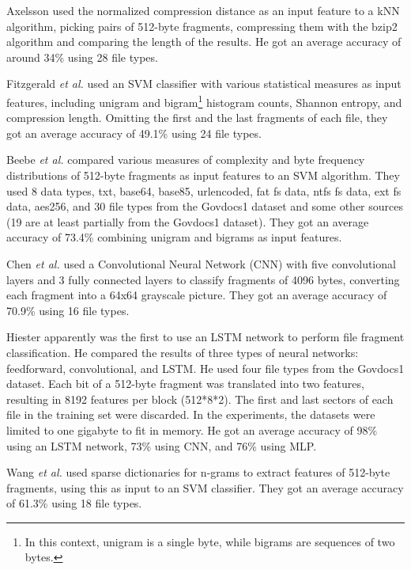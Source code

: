 Axelsson \cite{axelsson_normalised_2010} used the normalized compression distance as an input feature to a kNN algorithm, picking pairs of 512-byte fragments, compressing them with the bzip2 algorithm and comparing the length of the results.
He got an average accuracy of around 34\% using 28 file types.

Fitzgerald \textit{et al.} \cite{fitzgerald_using_2012}  used an SVM classifier with various statistical measures as input features, including unigram and bigram\footnote{
    In this context, unigram is a single byte, while bigrams are sequences of two bytes.
} histogram counts, Shannon entropy, and compression length.
Omitting the first and the last fragments of each file, they got an average accuracy of 49.1\% using 24 file types.

Beebe \textit{et al.} \cite{beebe_sceadan:_2013}
compared various measures of complexity and byte frequency distributions of 512-byte fragments as input features to an SVM algorithm. They used 8 data types, txt, base64, base85, urlencoded, fat fs data, ntfs fs data, ext fs data, aes256, and
30 file types
from the Govdocs1 dataset and some other sources (19 are at least partially from the Govdocs1 dataset). They got an average accuracy of 73.4\% combining unigram and bigrams as input features.

Chen \textit{et al.} \cite{chen_file_2018}
used a Convolutional Neural Network (CNN) with five convolutional layers and 3 fully connected layers to classify fragments of 4096 bytes, converting each fragment into a 64x64 grayscale picture.
They got an average accuracy of 70.9\% using 16 file types.

Hiester \cite{hiester_file_2018} apparently was the first to use an LSTM network to perform file fragment classification. He compared the results of three types of neural networks: feedforward, convolutional, and LSTM. He used four file types from the Govdocs1 dataset.
Each bit of a 512-byte fragment was translated into two features, resulting in 8192 features per block (512*8*2). The first and last sectors of each file in the training set were discarded. In the experiments, the datasets were limited to one gigabyte to fit in memory. He got an average accuracy of 98\% using an LSTM network, 73\% using CNN, and 76\% using MLP.

Wang \textit{et al.} \cite{wang_sparse_2018} 
used sparse dictionaries for n-grams to extract features of 512-byte fragments, using this as input to an SVM classifier.
They got an average accuracy of 61.3\% using 18 file types.

